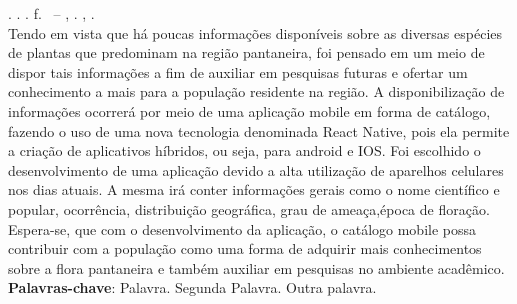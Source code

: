 
\begin{resumo}[RESUMO]
\begin{SingleSpacing}

\imprimirautorcitacao. \imprimirtitulo. \imprimirdata. \pageref {LastPage} f. \imprimirprojeto\ – \imprimirprograma, \imprimirinstituicao. \imprimirlocal, \imprimirdata.\\

Tendo em vista que há poucas informações disponíveis sobre as diversas espécies de plantas que predominam na região pantaneira, foi pensado em um meio de dispor tais informações a fim de auxiliar em pesquisas futuras e ofertar um conhecimento a mais para a população residente na região.
A disponibilização de informações ocorrerá por meio de uma aplicação mobile em forma de catálogo, fazendo o uso de uma nova tecnologia denominada React Native, pois ela permite a criação de aplicativos híbridos, ou seja, para android e IOS.
Foi escolhido o desenvolvimento de uma aplicação devido a alta utilização de aparelhos celulares nos dias atuais. A mesma  irá conter informações gerais como o nome científico e popular, ocorrência, distribuição geográfica, grau de ameaça,época de floração.
Espera-se, que com o desenvolvimento da aplicação, o  catálogo mobile possa contribuir com a população como uma forma de adquirir mais conhecimentos sobre a flora pantaneira e também auxiliar em pesquisas no ambiente acadêmico.\\


\textbf{Palavras-chave}: Palavra. Segunda Palavra. Outra palavra.

\end{SingleSpacing}
\end{resumo}


